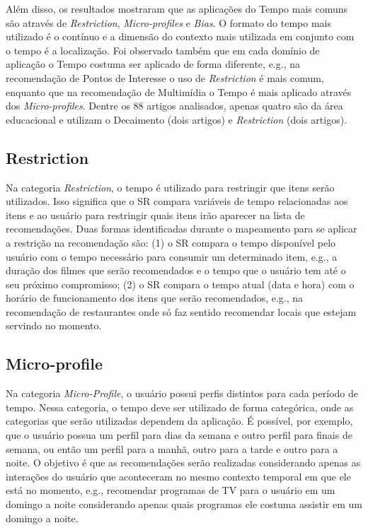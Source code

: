 Além disso, os resultados mostraram que as aplicações do Tempo mais comuns são através de \textit{Restriction},
\textit{Micro-profiles} e \textit{Bias}. O formato do tempo mais utilizado é o contínuo e a dimensão do contexto mais
utilizada em conjunto com o tempo é a localização. Foi observado também que em cada domínio de aplicação o Tempo costuma ser
aplicado de forma diferente, e.g., na recomendação de Pontos de Interesse o uso de \textit{Restriction} é mais comum, enquanto
que na recomendação de Multimídia o Tempo é mais aplicado através dos \textit{Micro-profiles}. Dentre os 88 artigos analisados,
apenas quatro são da área educacional e utilizam o Decaimento (dois artigos) e \textit{Restriction} (dois artigos).

\subsection{Restriction}\label{subsection:restriction}

Na categoria \textit{Restriction}, o tempo é utilizado para restringir que itens serão utilizados. Isso significa que o SR
compara variáveis de tempo relacionadas aos itens e ao usuário para restringir quais itens irão aparecer na lista de
recomendações. Duas formas identificadas durante o mapeamento para se aplicar a restrição na recomendação são: (1) o SR
compara o tempo disponível pelo usuário com o tempo necessário para consumir um determinado item, e.g., a duração dos
filmes que serão recomendados e o tempo que o usuário tem até o seu próximo compromisso; (2) o SR compara o tempo
atual (data e hora) com o horário de funcionamento dos itens que serão recomendados, e.g., na recomendação de restaurantes
onde só faz sentido recomendar locais que estejam servindo no momento.

\subsection{Micro-profile}

Na categoria \textit{Micro-Profile}, o usuário possui perfis distintos para cada período de tempo. Nessa categoria, o tempo
deve ser utilizado de forma categórica, onde as categorias que serão utilizadas dependem da aplicação.
É possível, por exemplo, que o usuário possua um perfil para dias da semana e outro perfil para finais de semana, ou
então um perfil para a manhã, outro para a tarde e outro para a noite. O objetivo é que as recomendações serão
realizadas considerando apenas as interações do usuário que aconteceram no mesmo contexto temporal em que ele está no
momento, e.g., recomendar programas de TV para o usuário em um domingo a noite considerando apenas quais programas ele
costuma assistir em um domingo a noite.

